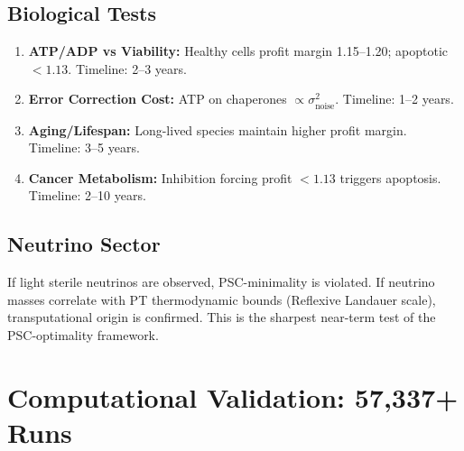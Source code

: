 \documentclass[11pt]{article}
\begin{document}
\subsection{Biological Tests}
\begin{enumerate}[leftmargin=1.5em,label=\arabic*.,resume]
\item \textbf{ATP/ADP vs Viability:} Healthy cells profit margin 1.15--1.20; apoptotic $<1.13$. Timeline: 2--3 years.
\item \textbf{Error Correction Cost:} ATP on chaperones $\propto\sigma^2_\mathrm{noise}$. Timeline: 1--2 years.
\item \textbf{Aging/Lifespan:} Long-lived species maintain higher profit margin. Timeline: 3--5 years.
\item \textbf{Cancer Metabolism:} Inhibition forcing profit $<1.13$ triggers apoptosis. Timeline: 2--10 years.
\end{enumerate}

\subsection{Neutrino Sector}
If light sterile neutrinos are observed, PSC-minimality is violated. If neutrino masses correlate with PT thermodynamic bounds (Reflexive Landauer scale), transputational origin is confirmed. This is the sharpest near-term test of the PSC-optimality framework.

\section{Computational Validation: 57,337+ Runs}
\end{document}
